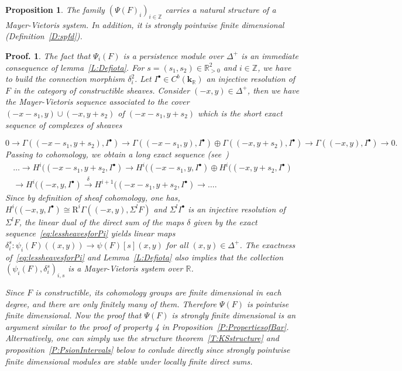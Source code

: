 \documentclass[a4paper, english, 11pt]{article}
\newcommand{\kk}[0]{\textbf{k}}
\newcommand{\0}{\vec{0}}
\newcommand{\R}[0]{\mathbb{R}}
\newcommand{\Z}[0]{\mathbb{Z}}
\newcommand{\Rr}[0]{\text{R}}
\newtheorem{prop}{Proposition}[section]
\newtheorem*{pf}{Proof.} }
\begin{document}
\begin{prop}\label{P:psiofCOnstrisMV}
The family $(\Psi(F)_i)_{i\in \Z}$ carries a natural structure of a Mayer-Vietoris system. In addition, it is strongly pointwise finite dimensional (Definition~\ref{D:spfd}). 
\end{prop}

\begin{pf} The fact that $\Psi_i(F)$ is a persistence module over $\Delta^+$ is an immediate consequence of lemma~\ref{L:Defiota}.
For $s = (s_1,s_2)\in \R^2_{>0}$ and $i\in\Z$, we have to build the connection morphism $\delta_i^2$. Let $I^\bullet\in C^b(\kk_\R)$ an injective resolution of $F$ in the category of constructible sheaves. Consider $(-x,y)\in \Delta^+$, then we have the Mayer-Vietoris sequence associated to the cover $(-x - s_1 , y) \cup (-x , y + s_2) $ of $(-x - s_1 , y + s_2)$ which is the short exact sequence of complexes of sheaves 

$$0 \longrightarrow \Gamma((-x - s_1 , y + s_2), I^\bullet) \longrightarrow \Gamma((-x - s_1 , y), I^\bullet) \oplus  \Gamma((-x , y+s_2), I^\bullet) \longrightarrow \Gamma((-x,y), I^\bullet) \longrightarrow 0 .$$
Passing to cohomology, we obtain a long exact sequence (see~\cite{Kash90}) 
\begin{multline}\label{eq:lessheavesforPi} 
\dots \to     H^i((-x-s_1, y+s_2, I^\bullet) \to 
 H^i((-x-s_1, y, I^\bullet) \oplus  H^i((-x, y+s_2, I^\bullet) \\ \to 
  H^i((-x, y, I^\bullet) \stackrel{\delta}\to H^{i+1}((-x-s_1, y+s_2, I^\bullet) \to \dots.
\end{multline}
Since by definition of sheaf cohomology, one has, $H^i((-x, y, I^\bullet) \cong \Rr^i\Gamma \left ( (-x,y) , \Sigma^l F\right )$ and $\Sigma^l I^\bullet$ is an injective resolution of $\Sigma^l F$, the linear dual of the direct sum of the maps $\delta$ given by the exact sequence~\eqref{eq:lessheavesforPi} yields linear maps $\delta_i^s:\psi_i(F)((x,y)) \to \psi(F)[s](x,y)$ for all $(x,y) \in \Delta^+$. The exactness of~\eqref{eq:lessheavesforPi} and Lemma~\ref{L:Defiota} also implies that the collection $(\psi_i(F), \delta_i^s)_{i,s}$ is a Mayer-Vietoris system over $\R$.

Since $F$ is constructible, its cohomology groups are finite dimensional in each degree, and there are only finitely many of them. Therefore $\Psi(F)$ is pointwise finite dimensional. Now the proof that $\Psi(F)$ is strongly finite dimensional is an argument similar to the proof of property 4 in Proposition~\ref{P:PropertiesofBar}. Alternatively, one can simply use the structure theorem~\ref{T:KSstructure}
and proposition~\ref{P:PsionIntervals} below to conlude directly since  strongly pointwise finite dimensional modules are stable under locally finite direct sums.\end{pf}
\end{document}
